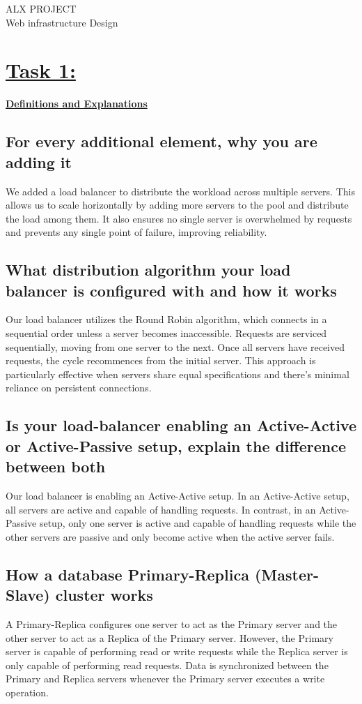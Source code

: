 \documentclass[a4paper, 10pt]{article}
\begin{document}
\justifying
    \begin{center}
        ALX PROJECT \\
        Web infrastructure Design 
    \end{center}
\section*{\underline{Task 1:}}
    \large
    \textbf{\underline{ Definitions and Explanations}}
    \subsection*{For every additional element, why you are adding it}
        We added a load balancer to distribute the workload across multiple servers. 
        This allows us to scale horizontally by adding more servers to the pool and 
        distribute the load among them. 
        It also ensures no single server is overwhelmed by requests and 
        prevents any single point of failure, improving reliability.
    \subsection*{What distribution algorithm your load balancer is configured with and how it works}
        Our load balancer utilizes the Round Robin algorithm, which connects in a sequential order unless a server becomes inaccessible.
        Requests are serviced sequentially, moving from one server to the next. Once all servers have received requests,
        the cycle recommences from the initial server.
        This approach is particularly effective when servers share equal specifications and there's minimal reliance on persistent connections.
    \subsection*{Is your load-balancer enabling an Active-Active or Active-Passive setup, explain the difference between both}
        Our load balancer is enabling an Active-Active setup. 
        In an Active-Active setup, all servers are active and capable of handling requests. 
        In contrast, in an Active-Passive setup, only one server is active and capable of handling 
        requests while the other servers are passive and only become active when the active server fails.
    \subsection*{How a database Primary-Replica (Master-Slave) cluster works}
        A Primary-Replica configures one server to act as the Primary server and the other server to act as a Replica of the Primary server. 
        However, the Primary server is capable of performing read or write requests while the Replica server is only capable of performing read requests.
        Data is synchronized between the Primary and Replica servers whenever the Primary server executes a write operation.
\end{document}
